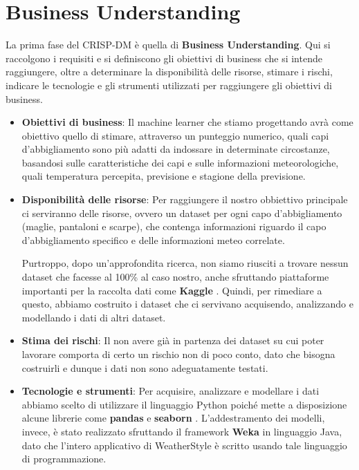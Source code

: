 \documentclass[a4paper, 11pt, oneside]{report}
\begin{document}
            \section{Business Understanding}
            La prima fase del CRISP-DM è quella di \textbf{Business Understanding}.
            Qui si raccolgono i requisiti e si definiscono gli obiettivi di business che si intende raggiungere, oltre a
            determinare la disponibilità delle risorse, stimare i rischi, indicare le tecnologie e gli strumenti utilizzati
            per raggiungere gli obiettivi di business.
            \par \noindent
            \begin{itemize}
                \item \textbf{Obiettivi di business}: Il machine learner che stiamo progettando avrà come obiettivo quello di
                stimare, attraverso un punteggio numerico, quali capi d'abbigliamento sono più adatti da indossare in
                determinate circostanze, basandosi
                sulle caratteristiche dei capi e sulle informazioni meteorologiche, quali temperatura percepita, previsione e
                stagione della previsione.
                \item \textbf{Disponibilità delle risorse}: Per raggiungere il nostro obbiettivo principale ci serviranno
                delle risorse, ovvero un dataset per ogni capo d'abbigliamento (maglie, pantaloni e scarpe),
                che contenga informazioni riguardo il capo d'abbigliamento specifico e delle informazioni meteo correlate.
                \par \noindent Purtroppo, dopo un'approfondita ricerca, non siamo riusciti a trovare nessun dataset che facesse
                al 100\% al caso nostro, anche sfruttando piattaforme importanti per la raccolta dati come \textbf{Kaggle} \cite{3}.
                Quindi, per rimediare a questo, abbiamo costruito i dataset che ci servivano acquisendo, analizzando e modellando
                i dati di altri dataset.
                \item \textbf{Stima dei rischi}: Il non avere già in partenza dei dataset su cui poter lavorare comporta
                di certo un rischio non di poco conto, dato che bisogna costruirli e dunque i dati non sono adeguatamente testati.
                \item \textbf{Tecnologie e strumenti}: Per acquisire, analizzare e modellare i dati abbiamo scelto di utilizzare
                il linguaggio Python poiché mette a disposizione alcune librerie come \textbf{pandas} \cite{4} e \textbf{seaborn} \cite{5}.
                L'addestramento dei modelli, invece, è stato realizzato
                sfruttando il framework \textbf{Weka} \cite{2} in linguaggio Java, dato che l'intero applicativo di WeatherStyle
                è scritto usando tale linguaggio di programmazione.
            \end{itemize}
\end{document}
